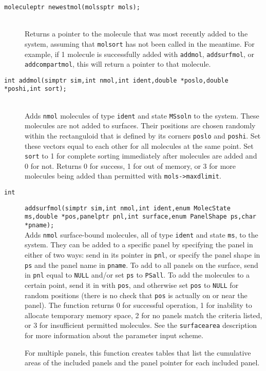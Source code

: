 \documentclass {book}
\begin{document}
\begin{description}
\item[\texttt{moleculeptr newestmol(molssptr mols);}]
\hfill \\
Returns a pointer to the molecule that was most recently added to the system, assuming that \texttt{molsort} has not been called in the meantime.  For example, if 1 molecule is successfully added with \texttt{addmol}, \texttt{addsurfmol}, or \texttt{addcompartmol}, this will return a pointer to that molecule.

\item[\texttt{int addmol(simptr sim,int nmol,int ident,double *poslo,double *poshi,int sort);}]
\hfill \\
Adds \texttt{nmol} molecules of type \texttt{ident} and state \texttt{MSsoln} to the system.  These molecules are not added to surfaces.  Their positions are chosen randomly within the rectanguloid that is defined by its corners \texttt{poslo} and \texttt{poshi}.  Set these vectors equal to each other for all molecules at the same point.  Set \texttt{sort} to 1 for complete sorting immediately after molecules are added and 0 for not.  Returns 0 for success, 1 for out of memory, or 3 for more molecules being added than permitted with \texttt{mols->maxdlimit}.

\item[\texttt{int}]
\texttt{addsurfmol(simptr sim,int nmol,int ident,enum MolecState ms,double *pos,panelptr pnl,int surface,enum PanelShape ps,char *pname);} \\
Adds \texttt{nmol} surface-bound molecules, all of type \texttt{ident} and state \texttt{ms}, to the system.  They can be added to a specific panel by specifying the panel in either of two ways: send in its pointer in \texttt{pnl}, or specify the panel shape in \texttt{ps} and the panel name in \texttt{pname}.  To add to all panels on the surface, send in \texttt{pnl} equal to \texttt{NULL} and/or set \texttt{ps} to \texttt{PSall}.  To add the molecules to a certain point, send it in with \texttt{pos}, and otherwise set \texttt{pos} to \texttt{NULL} for random positions (there is no check that \texttt{pos} is actually on or near the panel).  The function returns 0 for successful operation, 1 for inability to allocate temporary memory space, 2 for no panels match the criteria listed, or 3 for insufficient permitted molecules.  See the \texttt{surfacearea} description for more information about the parameter input scheme.

For multiple panels, this function creates tables that list the cumulative areas of the included panels and the panel pointer for each included panel.


\end{description}
\end{document}
